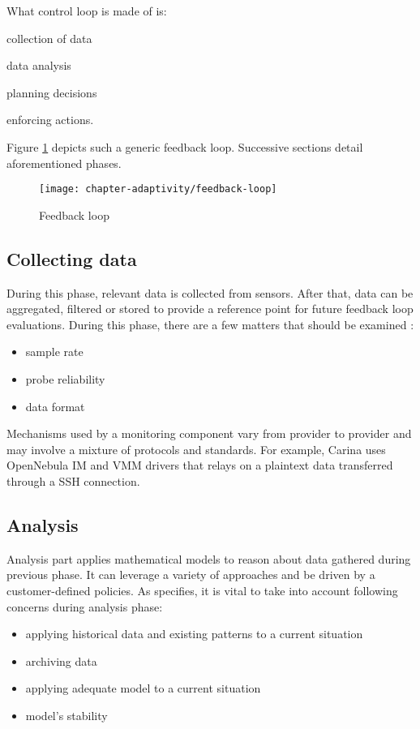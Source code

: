 What control loop is made of is:
\begin{inparaenum}[1)]
 \item collection of data
 \item data analysis
 \item planning decisions
 \item enforcing actions.
\end{inparaenum} Figure \ref{fig:feedback-loop} depicts such a generic feedback loop. Successive sections detail aforementioned phases.

\begin{figure}[!ht]
  \begin{center}
    \texttt{[image: chapter-adaptivity/feedback-loop]}
  \end{center}
  \caption{Feedback loop \cite{brun2009engineering}}
  \label{fig:feedback-loop}
\end{figure}

\subsection{Collecting data}
During this phase, relevant data is collected from sensors. After that, data can be aggregated, filtered or stored to provide a reference point for future feedback loop evaluations. During this phase, there are a few matters that should be examined \cite{brun2009engineering}:
\begin{itemize}
 \item sample rate
 \item probe reliability
 \item data format
\end{itemize}

Mechanisms used by a monitoring component vary from provider to provider and may involve a mixture of protocols and standards. For example, Carina \cite{Carina} uses OpenNebula IM and VMM drivers that relays on a plaintext data transferred through a SSH connection.

\subsection{Analysis}
Analysis part applies mathematical models to reason about data gathered during previous phase. It can leverage a variety of approaches and be driven by a customer-defined policies. As \cite{brun2009engineering} specifies, it is vital to take into account following concerns during analysis phase:
\begin{itemize}
 \item applying historical data and existing patterns to a current situation
 \item archiving data
 \item applying adequate model to a current situation
 \item model's stability
\end{itemize}

